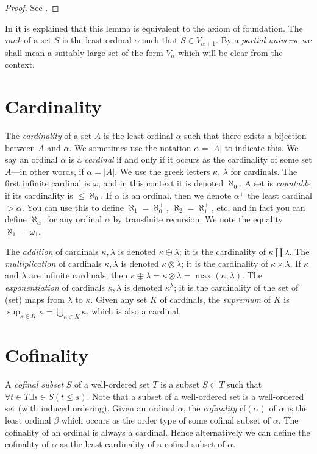 \begin{proof}
See \cite[Lemma 6.3]{Jech}.
\end{proof}

In \cite[Chapter III]{Kunen} it is explained that this lemma is
equivalent to the axiom of foundation. The {\it rank} of
a set $S$ is the least ordinal $\alpha$ such that $S \in V_{\alpha + 1}$.
By a {\it partial universe} we shall mean a suitably large set of the form
$V_\alpha$ which will be clear from the context.

\section{Cardinality}
\label{sets-section-cardinals}
The {\it cardinality} of a set $A$ is the least ordinal $\alpha$
such that there exists a bijection between $A$ and $\alpha$.
We sometimes use the notation $\alpha = |A|$ to indicate this.
We say an ordinal $\alpha$ is a {\it cardinal} if and only
if it occurs as the cardinality of some set $A$---in other words, if
$\alpha = |A|$. We use the greek letters $\kappa$, $\lambda$
for cardinals. The first infinite cardinal is $\omega$, and in this
context it is denoted $\aleph_0$. A set is {\it countable} if its cardinality
is $\leq \aleph_0$. If $\alpha$ is an ordinal, then we denote
$\alpha^+$ the least cardinal $> \alpha$. You can use this to
define $\aleph_1 = \aleph_0^+$, $\aleph_2 = \aleph_1^+$, etc, and
in fact you can define $\aleph_\alpha$ for any ordinal $\alpha$ by
transfinite recursion. We note the equality $\aleph_1 = \omega_1$.

\medskip\noindent
The {\it addition} of cardinals $\kappa, \lambda$
is denoted $\kappa \oplus \lambda$; it is the cardinality of
$\kappa \amalg \lambda$. The {\it multiplication} of cardinals
$\kappa, \lambda$ is denoted $\kappa \otimes \lambda$; it is the
cardinality of $\kappa \times \lambda$. If
$\kappa$ and $\lambda$ are infinite cardinals, then
$\kappa \oplus \lambda = \kappa \otimes \lambda = \max(\kappa, \lambda)$.
The {\it exponentiation}
of cardinals $\kappa, \lambda$ is denoted $\kappa^\lambda$; it is
the cardinality of the set of (set) maps from $\lambda$ to $\kappa$.
Given any set $K$ of cardinals, the {\it supremum} of $K$
is $\sup_{\kappa \in K} \kappa = \bigcup_{\kappa \in K} \kappa$,
which is also a cardinal.

\section{Cofinality}
\label{sets-section-cofinality}
A {\it cofinal subset} $S$ of a well-ordered set $T$ is a subset
$S \subset T$ such that $\forall t \in T \exists s\in S (t \leq s)$.
Note that a subset of a well-ordered set is a well-ordered set
(with induced ordering). Given an ordinal $\alpha$, the {\it cofinality}
$\text{cf}(\alpha)$ of $\alpha$ is the least ordinal $\beta$
which occurs as the order type of some cofinal subset of $\alpha$.
The cofinality of an ordinal is always a cardinal.
Hence alternatively we can define the cofinality of
$\alpha$ as the least cardinality of a cofinal subset of $\alpha$.

